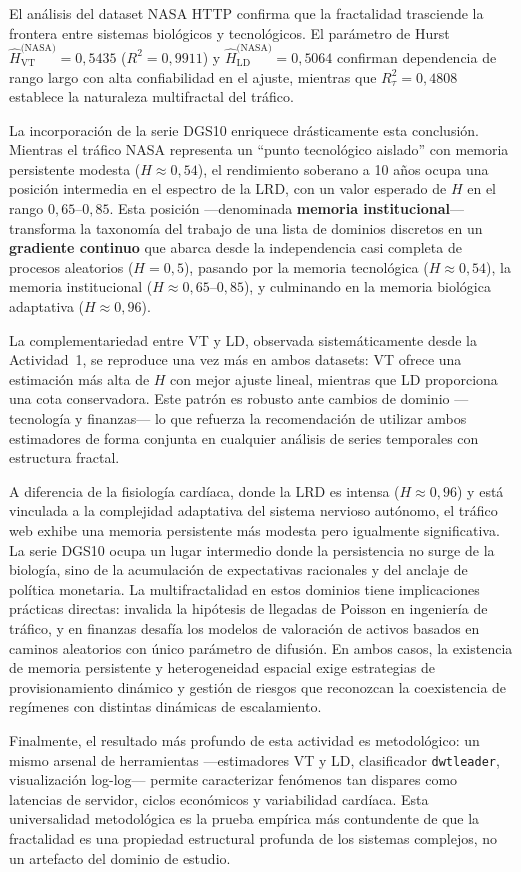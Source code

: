 El análisis del dataset NASA HTTP confirma que la fractalidad trasciende la
frontera entre sistemas biológicos y tecnológicos. El parámetro de Hurst
$\hat{H}_{\text{VT}}^{\text{(NASA)}} = 0{,}5435$ ($R^2 = 0{,}9911$) y
$\hat{H}_{\text{LD}}^{\text{(NASA)}} = 0{,}5064$ confirman dependencia de rango largo con
alta confiabilidad en el ajuste, mientras que $R^2_{\tau} = 0{,}4808$
establece la naturaleza multifractal del tráfico.

La incorporación de la serie DGS10 enriquece drásticamente esta conclusión.
Mientras el tráfico NASA representa un ``punto tecnológico aislado'' con memoria
persistente modesta ($H\approx0{,}54$), el rendimiento soberano a 10 años
ocupa una posición intermedia en el espectro de la LRD, con un valor esperado
de $H$ en el rango $0{,}65$--$0{,}85$. Esta posición ---denominada
\textbf{memoria institucional}--- transforma la taxonomía del trabajo de una
lista de dominios discretos en un \textbf{gradiente continuo} que abarca desde
la independencia casi completa de procesos aleatorios ($H=0{,}5$), pasando por
la memoria tecnológica ($H\approx0{,}54$), la memoria institucional
($H\approx0{,}65$--$0{,}85$), y culminando en la memoria biológica adaptativa
($H\approx0{,}96$).

La complementariedad entre VT y LD, observada sistemáticamente desde la
Actividad~1, se reproduce una vez más en ambos datasets: VT ofrece una
estimación más alta de $H$ con mejor ajuste lineal, mientras que LD proporciona
una cota conservadora. Este patrón es robusto ante cambios de dominio ---tecnología
y finanzas--- lo que refuerza la recomendación de utilizar ambos estimadores de
forma conjunta en cualquier análisis de series temporales con estructura
fractal.

A diferencia de la fisiología cardíaca, donde la LRD es intensa
($H\approx0{,}96$) y está vinculada a la complejidad adaptativa del sistema
nervioso autónomo, el tráfico web exhibe una memoria persistente más modesta
pero igualmente significativa. La serie DGS10 ocupa un lugar intermedio
donde la persistencia no surge de la biología, sino de la acumulación de
expectativas racionales y del anclaje de política monetaria. La
multifractalidad en estos dominios tiene implicaciones prácticas directas:
invalida la hipótesis de llegadas de Poisson en ingeniería de tráfico, y en
finanzas desafía los modelos de valoración de activos basados en caminos
aleatorios con único parámetro de difusión. En ambos casos, la existencia de
memoria persistente y heterogeneidad espacial exige estrategias de
provisionamiento dinámico y gestión de riesgos que reconozcan la coexistencia
de regímenes con distintas dinámicas de escalamiento.

Finalmente, el resultado más profundo de esta actividad es metodológico: un
mismo arsenal de herramientas ---estimadores VT y LD, clasificador
\texttt{dwtleader}, visualización log-log--- permite caracterizar fenómenos tan
dispares como latencias de servidor, ciclos económicos y variabilidad cardíaca.
Esta universalidad metodológica es la prueba empírica más contundente de que la
fractalidad es una propiedad estructural profunda de los sistemas complejos, no
un artefacto del dominio de estudio.
